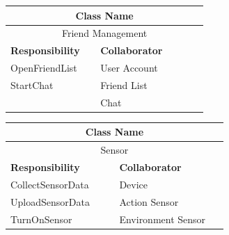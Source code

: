 \documentclass[a4paper]{article}
\begin{document}
	\noindent\begin{minipage}{\textwidth}
		\begin{minipage}[t]{0.48\textwidth}
		\centering
		\makeatletter{}\makeatother\caption*{}
			\begin{tabular}{|p{0.40\linewidth}|p{0.48\linewidth}|} 
				\hline
				\multicolumn{2}{|c|}{\textbf{Class Name}} \\
				\hline
				\multicolumn{2}{|c|}{Friend Management} \\
				\hline
				\textbf{Responsibility} & \textbf{Collaborator} \\
				\hline
				OpenFriendList& User Account\\
				StartChat & Friend List\\
				& Chat\\
				\hline
			\end{tabular}
		\end{minipage}
	 	\begin{minipage}[t]{0.48\textwidth}
		\centering
		\makeatletter{}\makeatother\caption*{}
			\begin{tabular}{|p{0.44\linewidth}|p{0.44\linewidth}|} 
				\hline
				\multicolumn{2}{|c|}{\textbf{Class Name}} \\
				\hline
				\multicolumn{2}{|c|}{Sensor} \\
				\hline
				\textbf{Responsibility} & \textbf{Collaborator} \\
				\hline
				CollectSensorData & Device \\
				UploadSensorData & Action Sensor\\
				TurnOnSensor & Environment Sensor\\
				\hline
			\end{tabular}
		\end{minipage}
   	\end{minipage}
\end{document}
